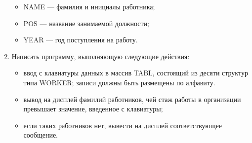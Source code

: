 \begin{enumerate}[leftmargin=*]
    \begin{itemize}
        \item NAME — фамилия и инициалы работника;
        \item POS — название занимаемой должности;
        \item YEAR — год поступления на работу.
    \end{itemize}
    \item Написать программу, выполняющую следующие действия:
    \begin{itemize}
        \item ввод с клавиатуры данных в массив TABL, состоящий из десяти структур типа WORKER; записи должны быть размещены по алфавиту.
        \item вывод на дисплей фамилий работников, чей стаж работы в организации превышает значение, введенное с клавиатуры;
        \item если таких работников нет, вывести на дисплей соответствующее сообщение.
    \end{itemize}
\end{enumerate}